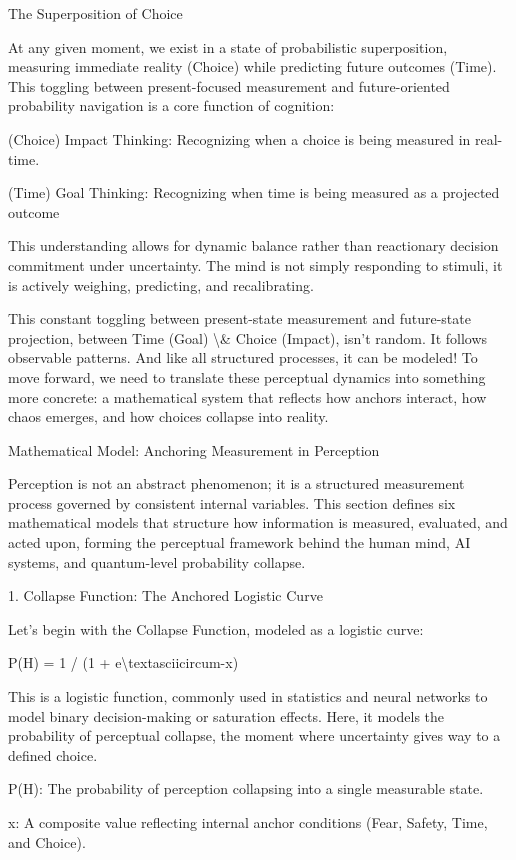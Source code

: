 \documentclass[12pt]{article}
\begin{document}
The Superposition of Choice

At any given moment, we exist in a state of probabilistic superposition, measuring immediate reality (Choice) while predicting future outcomes (Time). This toggling between present-focused measurement and future-oriented probability navigation is a core function of cognition:

(Choice) Impact Thinking: Recognizing when a choice is being measured in real-time.

(Time) Goal Thinking: Recognizing when time is being measured as a projected outcome

This understanding allows for dynamic balance rather than reactionary decision commitment under uncertainty. The mind is not simply responding to stimuli, it is actively weighing, predicting, and recalibrating. 

This constant toggling between present-state measurement and future-state projection, between Time (Goal) \textbackslash{}& Choice (Impact), isn’t random. It follows observable patterns. And like all structured processes, it can be modeled!
To move forward, we need to translate these perceptual dynamics into something more concrete: a mathematical system that reflects how anchors interact, how chaos emerges, and how choices collapse into reality.

Mathematical Model: Anchoring Measurement in Perception

Perception is not an abstract phenomenon; it is a structured measurement process governed by consistent internal variables. This section defines six mathematical models that structure how information is measured, evaluated, and acted upon, forming the perceptual framework behind the human mind, AI systems, and quantum-level probability collapse.

1. Collapse Function: The Anchored Logistic Curve

Let’s begin with the Collapse Function, modeled as a logistic curve:

P(H) = 1 / (1 + e\textbackslash{}textasciicircum{}-x)

This is a logistic function, commonly used in statistics and neural networks to model binary decision-making or saturation effects. Here, it models the probability of perceptual collapse, the moment where uncertainty gives way to a defined choice.

P(H): The probability of perception collapsing into a single measurable state.

x: A composite value reflecting internal anchor conditions (Fear, Safety, Time, and Choice).
\end{document}
